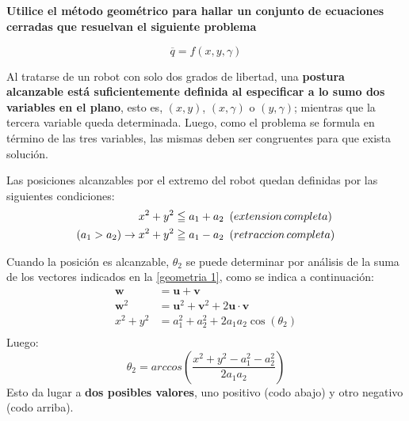 \documentclass[a4paper,12pt]{article}
\begin{document}
\subsection{}
\textbf{Utilice el método geométrico para hallar un conjunto de ecuaciones cerradas que resuelvan el siguiente problema}

\begin{equation*}
    \overline{q} = f\left(x,y,\gamma\right)
\end{equation*}

Al tratarse de un robot con solo dos grados de libertad, una \textbf{postura alcanzable está suficientemente definida al especificar
a lo sumo dos variables en el plano}, esto es, $\left(x,y\right)$, $\left(x,\gamma\right)$ o $\left(y, \gamma\right)$; mientras que
la tercera variable queda determinada. Luego, como el problema se formula en término de las tres variables, las mismas deben ser congruentes para
que exista solución.

Las posiciones alcanzables por el extremo del robot quedan definidas por las siguientes condiciones:
\begin{equation}
    \begin{aligned}
        x^2 + y^2 &\leqq  a_1 + a_2\,\,\, \text(extension\,completa)\\
        \left(a_1 > a_2 \right)\rightarrow x^2 + y^2 & \geqq  a_1 - a_2\,\,\, \text(retraccion\,completa)
    \end{aligned}
    \label{rango}
\end{equation}

Cuando la posición es alcanzable, $\theta_2$ se puede determinar por análisis de la suma de los vectores indicados en la \cref{geometria 1}, como se indica a continuación:
\begin{align*}
    \mathbf{w} &= \mathbf{u} + \mathbf{v}\\
    \mathbf{w}^2 &= \mathbf{u}^2 + \mathbf{v}^2 + 2\mathbf{u}\cdot\mathbf{v}\\
    x^2 + y^2 &= a_{1}^2 + a_{2}^2 + 2a_{1}a_{2}\cos(\theta_2)\\
\end{align*}
Luego:
\begin{equation}
    \theta_2 = arccos\left(\frac{x^2 + y^2 - a_{1}^2 - a_{2}^2}{2a_{1}a_{2}}\right)
    \label{teta2}
\end{equation}
Esto da lugar a \textbf{dos posibles valores}, uno positivo (codo abajo) y otro negativo (codo arriba).
\end{document}
